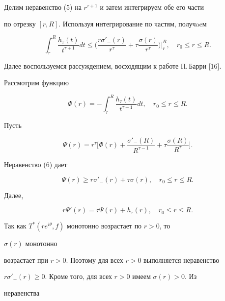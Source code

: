 Делим неравенство (5) на $r^{\tau+1}$ и затем интегрируем обе его части 


по отрезку $[r,R]$. Используя интегрирование по частям, получaeм 


\begin{equation} 


\int^R_r\frac{h_\tau(t)}{t^{\tau+1}}dt\le\bigg( 


\frac{r\sigma'_-(r)}{r^\tau}+\tau\frac{\sigma(r)}{r^\tau} 


\bigg)\bigg|^R_r,\quad r_0\le r\le R. 


\end{equation} 


Далее воспользуемся рассуждением, восходящим к работе П.\,Барри [16]. 


Рассмотрим функцию 


$$ 


\Phi(r)=-\int^R_r\frac{h_\tau(t)}{t^{\tau+1}}dt,\quad 


r_0\le r\le R. 


$$ 


Пусть 


$$ 


\Psi(r)=r^\tau\bigg[\Phi(r)+\frac{\sigma'_-(R)}{R^{\tau-1}}+ 


\tau\frac{\sigma(R)}{R^\tau}\bigg]. 


$$ 


Неравенство (6) дает 


\begin{equation} 


\Psi(r)\ge r\sigma'_-(r)+\tau\sigma(r),\quad r_0\le r\le R. 


\end{equation} 


Далее, 


\begin{equation} 


r\Psi'(r)=\tau\Psi(r)+h_\tau(r),\quad r_0\le r\le R. 


\end{equation} 


Так как $T^*(r e^{i\theta},f)$ монотонно возрастает по $r>0$, то 


$\sigma(r)$ монотонно 


возрастает при $r>0$. Поэтому для всех $r>0$ выполняется неравенство 


$r\sigma'_-(r)\ge0$. Кроме того, для всех $r>0$ имеем $\sigma(r)>0$. Из 


неравенства 


